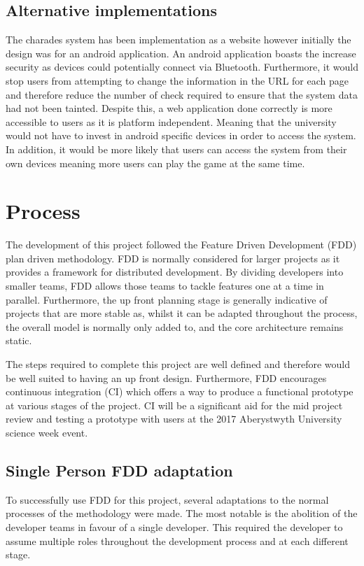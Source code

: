 \subsection{Alternative implementations}
The charades system has been implementation as a website however initially the design was for an android application. An android application boasts the increase security as devices could potentially connect via Bluetooth. Furthermore, it would stop users from attempting to change the information in the URL for each page and therefore reduce the number of check required to ensure that the system data had not been tainted.
Despite this, a web application done correctly is more accessible to users as it is platform independent. Meaning that the university would not have to invest in android specific devices in order to access the system. In addition, it would be more likely that users can access the system from their own devices meaning more users can play the game at the same time.

\section{Process}
The development of this project followed the Feature Driven Development (FDD) plan driven methodology. FDD is normally considered for larger projects as it provides a framework for distributed development. By dividing developers into smaller teams, FDD allows those teams to tackle features one at a time in parallel. Furthermore, the up front planning stage is generally indicative of projects that are more stable as, whilst it can be adapted throughout the process, the overall model is normally only added to, and the core architecture remains static.

The steps required to complete this project are well defined and therefore would be well suited to having an up front design. Furthermore, FDD encourages continuous integration (CI) which offers a way to produce a functional prototype at various stages of the project. CI will be a significant aid for the mid project review and testing a prototype with users at the 2017 Aberystwyth University science week event.

\subsection{Single Person FDD adaptation}
To successfully use FDD for this project, several adaptations to the normal processes of the methodology were made. The most notable is the abolition of the developer teams in favour of a single developer. This required the developer to assume multiple roles throughout the development process and at each different stage.

